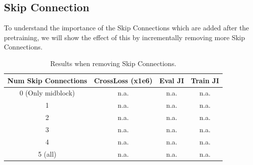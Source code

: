 \subsection{Skip Connection}
To understand the importance of the Skip Connections which are added after the pretraining, we will show the effect of this by incrementally removing more
Skip Connections.

\begin{table}[!ht]
    \centering
    \caption{Results when removing Skip Connections.}
    \label{tab:abl-skip-connection}
    \begin{tabular}{cccc}
        \hline
        Num Skip Connections & CrossLoss (x1e6) & Eval JI & Train JI \\
        \hline
        0 (Only midblock)    & n.a.             & n.a.    & n.a.     \\
        1                    & n.a.             & n.a.    & n.a.     \\
        2                    & n.a.             & n.a.    & n.a.     \\
        3                    & n.a.             & n.a.    & n.a.     \\
        4                    & n.a.             & n.a.    & n.a.     \\
        5 (all)              & n.a.             & n.a.    & n.a.     \\
        \hline
    \end{tabular}
\end{table}
